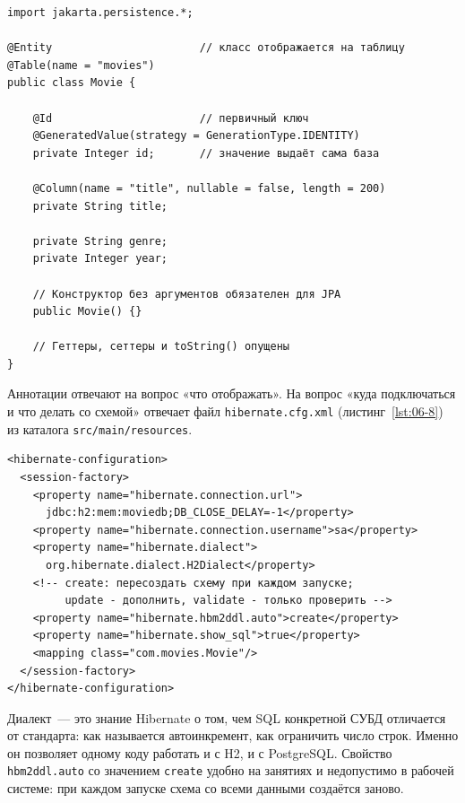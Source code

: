 \begin{listing}[H]
\begin{verbatim}
import jakarta.persistence.*;

@Entity                       // класс отображается на таблицу
@Table(name = "movies")
public class Movie {

    @Id                       // первичный ключ
    @GeneratedValue(strategy = GenerationType.IDENTITY)
    private Integer id;       // значение выдаёт сама база

    @Column(name = "title", nullable = false, length = 200)
    private String title;

    private String genre;
    private Integer year;

    // Конструктор без аргументов обязателен для JPA
    public Movie() {}

    // Геттеры, сеттеры и toString() опущены
}
\end{verbatim}
\caption{Класс-сущность с аннотациями JPA}
\label{lst:06-7}
\end{listing}

Аннотации отвечают на вопрос «что отображать». На вопрос «куда подключаться и
что делать со схемой» отвечает файл \texttt{hibernate.cfg.xml}
(листинг~\ref{lst:06-8}) из каталога \texttt{src/main/resources}.

\begin{listing}[H]
\begin{verbatim}
<hibernate-configuration>
  <session-factory>
    <property name="hibernate.connection.url">
      jdbc:h2:mem:moviedb;DB_CLOSE_DELAY=-1</property>
    <property name="hibernate.connection.username">sa</property>
    <property name="hibernate.dialect">
      org.hibernate.dialect.H2Dialect</property>
    <!-- create: пересоздать схему при каждом запуске;
         update - дополнить, validate - только проверить -->
    <property name="hibernate.hbm2ddl.auto">create</property>
    <property name="hibernate.show_sql">true</property>
    <mapping class="com.movies.Movie"/>
  </session-factory>
</hibernate-configuration>
\end{verbatim}
\caption{Конфигурация Hibernate для базы H2}
\label{lst:06-8}
\end{listing}

Диалект~--- это знание Hibernate о том, чем SQL конкретной СУБД отличается от
стандарта: как называется автоинкремент, как ограничить число строк. Именно он
позволяет одному коду работать и с H2, и с PostgreSQL. Свойство
\texttt{hbm2ddl.auto} со значением \texttt{create} удобно на занятиях и
недопустимо в рабочей системе: при каждом запуске схема со всеми данными
создаётся заново.

